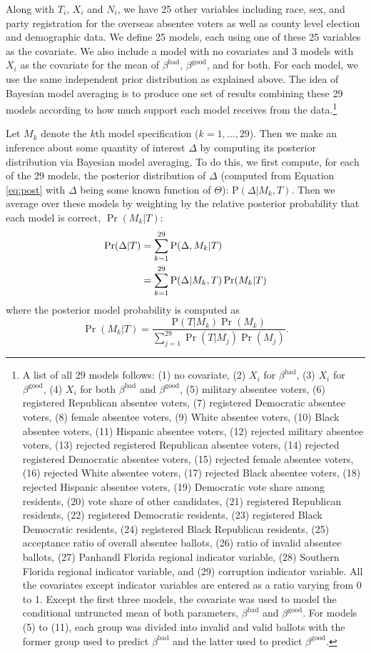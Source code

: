 \documentclass[11pt,titlepage]{article}
\renewcommand{\P}{\text{P}}
\newcommand{\bb}{\beta^{\text{bad}}}
\newcommand{\bg}{\beta^{\text{good}}}
\begin{document}
Along with $T_i$, $X_i$ and $N_i$, we have 25 other variables
including race, sex, and party registration for the overseas absentee
voters as well as county level election and demographic data.  We
define 25 models, each using one of these 25 variables as the
covariate.  We also include a model with no covariates and 3 models
with $X_i$ as the covariate for the mean of $\bb$, $\bg$, and for
both.  For each model, we use the same independent prior distribution
as explained above. The idea of Bayesian model averaging is to produce
one set of results combining these 29 models according to how much
support each model receives from the data.\footnote{A list of all 29
  models follows: (1) no covariate, (2) $X_i$ for $\bb$, (3) $X_i$ for
  $\bg$, (4) $X_i$ for both $\bb$ and $\bg$, (5) military absentee
  voters, (6) registered Republican absentee voters, (7) registered
  Democratic absentee voters, (8) female absentee voters, (9) White
  absentee voters, (10) Black absentee voters, (11) Hispanic absentee
  voters, (12) rejected military absentee voters, (13) rejected
  registered Republican absentee voters, (14) rejected registered
  Democratic absentee voters, (15) rejected female absentee voters,
  (16) rejected White absentee voters, (17) rejected Black absentee
  voters, (18) rejected Hispanic absentee voters, (19) Democratic vote
  share among residents, (20) vote share of other candidates, (21)
  registered Republican residents, (22) registered Democratic
  residents, (23) registered Black Democratic residents, (24)
  registered Black Republican residents, (25) acceptance ratio of
  overall absentee ballots, (26) ratio of invalid absentee ballots,
  (27) Panhandl Florida regional indicator variable, (28) Southern
  Florida regional indicator variable, and (29) corruption indicator
  variable. All the covariates except indicator variables are entered
  as a ratio varying from 0 to 1. Except the first three models, the
  covariate was used to model the conditional untruncted mean of both
  parameters, $\bb$ and $\bg$. For models (5) to (11), each group was
  divided into invalid and valid ballots with the former group used to
  predict $\bb$ and the latter used to predict $\bg$.}

Let $M_k$ denote the $k$th model specification ($k=1,\dots,29$). Then
we make an inference about some quantity of interest $\Delta$ by
computing its posterior distribution via Bayesian model averaging.  To
do this, we first compute, for each of the 29 models, the posterior
distribution of $\Delta$ (computed from Equation \ref{eq:post} with
$\Delta$ being some known function of $\Theta$): $\P(\Delta|M_k,T)$.
Then we average over these models by weighting by the relative
posterior probability that each model is correct, $\Pr(M_k|T)$:
\begin{align} \label{eq:bma}
  \Pr(\Delta|T) &= \sum_{k=1}^{29} \P(\Delta,M_k|T)\notag\\
                &= \sum_{k=1}^{29} \P(\Delta|M_k,T) \Pr(M_k|T)
\end{align}
where the posterior model probability is computed as
\begin{equation}
  \Pr(M_k|T)=\frac{\P(T|M_k)\Pr(M_k)}
             {\sum_{j=1}^{29} \Pr(T|M_j) \Pr(M_j)}.  \label{eq:postmodel}
\end{equation}
\end{document}
